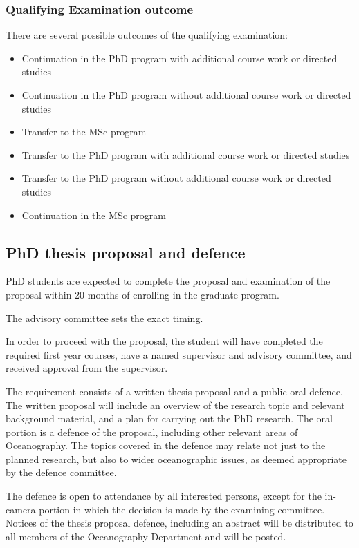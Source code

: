 \documentclass{article}
\begin{document}
\subsubsection{Qualifying Examination outcome}

There are several possible outcomes of the qualifying examination:

\begin{itemize}

\item Continuation in the PhD program with additional course work or directed studies
\item Continuation in the PhD program without additional course work or directed studies
\item Transfer to the MSc program
\item Transfer to the PhD program with additional course work or directed studies
\item Transfer to the PhD program without additional course work or directed studies
\item Continuation in the MSc program

\end{itemize}

\subsection{PhD thesis proposal and defence}

PhD students are expected to complete the proposal and examination of the
proposal within 20 months of enrolling in the graduate program.

The advisory committee sets the exact timing.

In order to proceed with the proposal, the student will have completed the
required first year courses, have a named supervisor and advisory committee,
and received approval from the supervisor.

The requirement consists of a written thesis proposal and a public oral
defence.  The written proposal will include an overview of the research topic
and relevant background material, and a plan for carrying out the PhD research.
The oral portion is a defence of the proposal, including other relevant areas
of Oceanography. The topics covered in the defence may relate not just to the
planned research, but also to wider oceanographic issues, as deemed appropriate
by the defence committee.

The defence is open to attendance by all interested persons, except for the
in-camera portion in which the decision is made by the examining committee.
Notices of the thesis proposal defence, including an abstract will be
distributed to all members of the Oceanography Department and will be posted.
\end{document}
